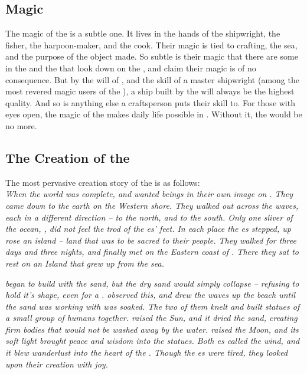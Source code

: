 \documentclass[blue]{GL2020}
\begin{document}
\subsection*{Magic}
The magic of the \pShip{} is a subtle one. It lives in the hands of the shipwright, the fisher, the harpoon-maker, and the cook. Their magic is tied to crafting, the sea, and the purpose of the object made. So subtle is their magic that there are some in the \pFarm{} and the \pTech{} that look down on the \pShippies{}, and claim their magic is of no consequence. But by the will of \cEbb{\full}, and the skill of a master shipwright (among the most revered magic users of the \pShip{}), a ship built by the \pShippies{} will always be the highest quality. And so is anything else a \pShippie{} craftsperson puts their skill to. For those with eyes open, the magic of the \pShippies{} makes daily life possible in \pEarth{}. Without it, the \pShippies{} would be no more.

\subsection*{The Creation of the \pShippies{}}
The most pervasive creation story of the \pShippies{} is as follows:\\
\emph{When the world was complete, \cEbb{} and \cFlow{} wanted beings in their own image on \pEarth{}. They came down to the earth on the Western shore. They walked out across the waves, each in a different direction -- \cEbb{} to the north, and \cFlow{} to the south. Only one sliver of the ocean, \pWod{}, did not feel the trod of the \cEbb{\God}es' feet. In each place the \cEbb{\God}es stepped, up rose an island -- land that was to be sacred to their people. They walked for three days and three nights, and finally met on the Eastern coast of \pEarth{}. There they sat to rest on an Island that grew up from the sea.}

\emph{\cFlow{} began to build with the sand, but the dry sand would simply collapse -- refusing to hold it's shape, even for a \cFlow{\God}. \cEbb{} observed this, and drew the waves up the beach until the sand \cFlow{} was working with was soaked. The two of them knelt and built statues of a small group of humans together. \cFlow{} raised the Sun, and it dried the sand, creating firm bodies that would not be washed away by the water. \cEbb{} raised the Moon, and its soft light brought peace and wisdom into the statues. Both \cEbb{\God}es called the wind, and it blew wanderlust into the heart of the \pShippies{}. Though the \cEbb{\God}es were tired, they looked upon their creation with joy.}
\end{document}
